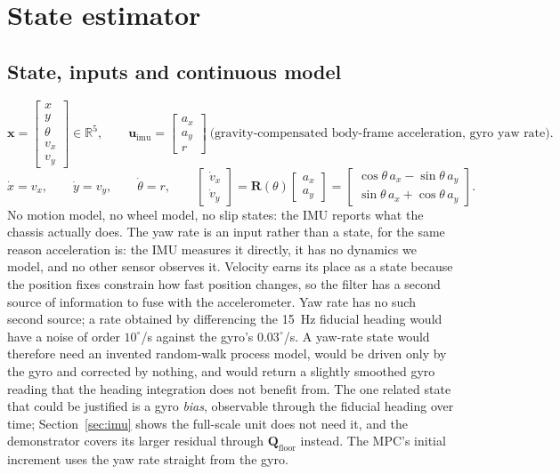 \documentclass[11pt,a4paper]{article}
\newcommand{\vect}[1]{\bm{#1}}
\newcommand{\mat}[1]{\bm{#1}}
\newcommand{\Real}{\mathbb{R}}
\newcommand{\Rot}{\mat{R}}
\begin{document}
\section{State estimator}
\label{sec:ekf}

\subsection{State, inputs and continuous model}
\begin{equation}
\vect x = \begin{bmatrix} x \\ y \\ \theta \\ v_x \\ v_y \end{bmatrix}\in\Real^5,
\qquad
\vect u_{\mathrm{imu}} = \begin{bmatrix} a_x \\ a_y \\ r \end{bmatrix}
\ \text{(gravity-compensated body-frame acceleration, gyro yaw rate)}.
\end{equation}
\begin{equation}
\dot x = v_x,\qquad \dot y = v_y,\qquad \dot\theta = r,\qquad
\begin{bmatrix}\dot v_x\\ \dot v_y\end{bmatrix} = \Rot(\theta)\begin{bmatrix}a_x\\ a_y\end{bmatrix}
=\begin{bmatrix}\cos\theta\,a_x-\sin\theta\,a_y\\ \sin\theta\,a_x+\cos\theta\,a_y\end{bmatrix}.
\label{eq:ct}
\end{equation}
No motion model, no wheel model, no slip states: the IMU reports what the chassis actually does. The yaw rate is an input rather than a state, for the same reason acceleration is: the IMU measures it directly, it has no dynamics we model, and no other sensor observes it. Velocity earns its place as a state because the position fixes constrain how fast position changes, so the filter has a second source of information to fuse with the accelerometer. Yaw rate has no such second source; a rate obtained by differencing the 15~Hz fiducial heading would have a noise of order $10^\circ$/s against the gyro's $0.03^\circ$/s. A yaw-rate state would therefore need an invented random-walk process model, would be driven only by the gyro and corrected by nothing, and would return a slightly smoothed gyro reading that the heading integration does not benefit from. The one related state that could be justified is a gyro \emph{bias}, observable through the fiducial heading over time; Section~\ref{sec:imu} shows the full-scale unit does not need it, and the demonstrator covers its larger residual through $\mat Q_{\mathrm{floor}}$ instead. The MPC's initial increment uses the yaw rate straight from the gyro.
\end{document}
